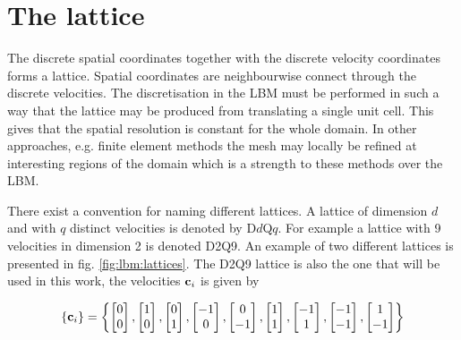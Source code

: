 \section{The lattice}\label{sec:lbm:lattice}
The discrete spatial coordinates together with the discrete velocity
coordinates forms a lattice. Spatial coordinates are neighbourwise
connect through the discrete velocities. The discretisation in the LBM
must be performed in such a way that the lattice may be produced from
translating a single unit cell. This gives that the spatial resolution
is constant for the whole domain. In other approaches, e.g. finite
element methods the mesh may locally be refined at interesting regions
of the domain which is a strength to these methods over the LBM.  

There exist a convention for naming different lattices. A lattice of
dimension $d$ and with $q$ distinct velocities is denoted by
D$d$Q$q$. For example a lattice with 9 velocities in dimension 2 is
denoted D2Q9. An example of two different lattices is presented in
fig. \ref{fig:lbm:lattices}. The D2Q9 lattice is also the one that
will be used in this work, the velocities $\mathbf{c}_i$ is given by

\begin{equation}\label{eq:lbm:d2q9_c}
\{\mathbf{c}_i\} = \left\{
\begin{bmatrix}0\\0\end{bmatrix}, 
\begin{bmatrix}1\\0\end{bmatrix}, 
\begin{bmatrix}0\\1\end{bmatrix}, 
\begin{bmatrix}-1\\0\end{bmatrix}, 
\begin{bmatrix}0\\-1\end{bmatrix}, 
\begin{bmatrix}1\\1\end{bmatrix}, 
\begin{bmatrix}-1\\1\end{bmatrix}, 
\begin{bmatrix}-1\\-1\end{bmatrix}, 
\begin{bmatrix}1\\-1\end{bmatrix}
\right\} 
\end{equation}

